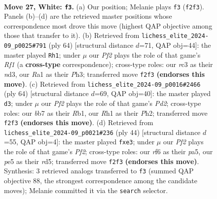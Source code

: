 \documentclass[11pt]{article}
\begin{document}
\begin{figure}[p]
\label{fig:thought-m50}
\end{figure}

\clearpage

\begin{figure}[p]\centering
\begin{subfigure}{0.46\textwidth}\centering
\resizebox{\linewidth}{!}{%
\newchessgame
\chessboard[
  setfen={7k/1b1n1p1p/5rp1/pp1Pp3/4P3/1Pr3P1/5P1P/R3K1NR w - - 0 27},
  showmover=false,
  pgfstyle=straightmove, color=movearrow, markmove={f2-f3}
]}
\caption{}
\end{subfigure}\hfill
\begin{subfigure}{0.46\textwidth}\centering
\resizebox{\linewidth}{!}{%
\newchessgame
\chessboard[
  setfen={8/N1p3k1/1p1p2p1/3Pp1p1/p1P3P1/Pr1n3P/1P3PK1/5R2 w - - 4 33},
  showmover=false,
  pgfstyle=straightmove, color=movearrow, markmove={f1-h1}
]}
\caption{}
\end{subfigure}
\\[4pt]
\begin{subfigure}{0.46\textwidth}\centering
\resizebox{\linewidth}{!}{%
\newchessgame
\chessboard[
  setfen={4r3/1p4kp/p1np2p1/P2N1p2/1pP1r3/4P1P1/3P1K1P/RR6 w - - 0 33},
  showmover=false,
  pgfstyle=straightmove, color=movearrow, markmove={d2-d3}
]}
\caption{}
\end{subfigure}\hfill
\begin{subfigure}{0.46\textwidth}\centering
\resizebox{\linewidth}{!}{%
\newchessgame
\chessboard[
  setfen={6k1/1pp2pp1/2p4p/p2r4/P2P4/1PP1r2P/5PP1/R5K1 w - - 0 23},
  showmover=false,
  pgfstyle=straightmove, color=movearrow, markmove={f2-e3}
]}
\caption{}
\end{subfigure}
\caption{\textbf{Move 27, White: \texttt{f3}.} (a) Our position; Melanie plays \texttt{f3} (\texttt{f2f3}). Panels (b)--(d) are the retrieved master positions whose correspondence most drove this move (highest QAP objective among those that transfer to it). (b) Retrieved from \texttt{lichess\_elite\_2024-09\_p0025\#791} (ply 64) [structural distance $d$=71, QAP obj=44]: the master played \texttt{Rh1}; under $\mu$ our \emph{Pf2} plays the role of that game's \emph{Rf1} (a \textbf{cross-type} correspondence); cross-type roles: our \emph{r}c3 as their \emph{n}d3, our \emph{R}a1 as their \emph{P}h3; transferred move \texttt{f2f3} \textbf{(endorses this move)}. (c) Retrieved from \texttt{lichess\_elite\_2024-09\_p0016\#2466} (ply 64) [structural distance $d$=69, QAP obj=40]: the master played \texttt{d3}; under $\mu$ our \emph{Pf2} plays the role of that game's \emph{Pd2}; cross-type roles: our \emph{b}b7 as their \emph{R}b1, our \emph{R}h1 as their \emph{P}h2; transferred move \texttt{f2f3} \textbf{(endorses this move)}. (d) Retrieved from \texttt{lichess\_elite\_2024-09\_p0021\#236} (ply 44) [structural distance $d$=55, QAP obj=4]: the master played \texttt{fxe3}; under $\mu$ our \emph{Pf2} plays the role of that game's \emph{Pf2}; cross-type roles: our \emph{r}f6 as their \emph{p}a5, our \emph{p}e5 as their \emph{r}d5; transferred move \texttt{f2f3} \textbf{(endorses this move)}. Synthesis: 3 retrieved analogs transferred to \texttt{f3} (summed QAP objective 88, the strongest correspondence among the candidate moves); Melanie committed it via the \texttt{search} selector.}

\end{figure}
\end{document}
